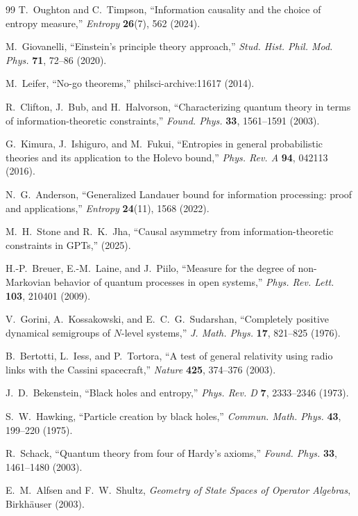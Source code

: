 \documentclass[12pt,a4paper]{article}
\theoremstyle{definition}
\theoremstyle{remark}
\begin{document}
\begin{thebibliography}{99}
T.~Oughton and C.~Timpson, ``Information causality and the choice of entropy measure,'' \textit{Entropy} \textbf{26}(7), 562 (2024).

M.~Giovanelli, ``Einstein's principle theory approach,'' \textit{Stud. Hist. Phil. Mod. Phys.} \textbf{71}, 72--86 (2020).

M.~Leifer, ``No-go theorems,'' philsci-archive:11617 (2014).

R.~Clifton, J.~Bub, and H.~Halvorson, ``Characterizing quantum theory in terms of information-theoretic constraints,'' \textit{Found. Phys.} \textbf{33}, 1561--1591 (2003).

G.~Kimura, J.~Ishiguro, and M.~Fukui, ``Entropies in general probabilistic theories and its application to the Holevo bound,'' \textit{Phys. Rev. A} \textbf{94}, 042113 (2016).

N.~G.~Anderson, ``Generalized Landauer bound for information processing: proof and applications,'' \textit{Entropy} \textbf{24}(11), 1568 (2022).

M.~H.~Stone and R.~K.~Jha, ``Causal asymmetry from information-theoretic constraints in GPTs,'' (2025).

H.-P.~Breuer, E.-M.~Laine, and J.~Piilo, ``Measure for the degree of non-Markovian behavior of quantum processes in open systems,'' \textit{Phys. Rev. Lett.} \textbf{103}, 210401 (2009).

V.~Gorini, A.~Kossakowski, and E.~C.~G.~Sudarshan, ``Completely positive dynamical semigroups of $N$-level systems,'' \textit{J. Math. Phys.} \textbf{17}, 821--825 (1976).

B.~Bertotti, L.~Iess, and P.~Tortora, ``A test of general relativity using radio links with the Cassini spacecraft,'' \textit{Nature} \textbf{425}, 374--376 (2003).

J.~D.~Bekenstein, ``Black holes and entropy,'' \textit{Phys. Rev. D} \textbf{7}, 2333--2346 (1973).

S.~W.~Hawking, ``Particle creation by black holes,'' \textit{Commun. Math. Phys.} \textbf{43}, 199--220 (1975).

R.~Schack, ``Quantum theory from four of Hardy's axioms,'' \textit{Found. Phys.} \textbf{33}, 1461--1480 (2003).

E.~M.~Alfsen and F.~W.~Shultz, \textit{Geometry of State Spaces of Operator Algebras}, Birkh\"auser (2003).


\end{thebibliography}
\end{document}

